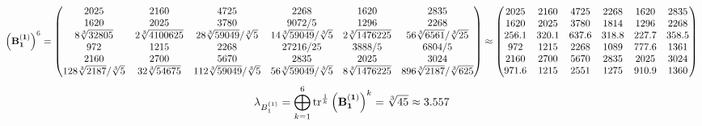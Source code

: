 \documentclass[10pt,a4paper]{article}
\begin{document}
	\[
		\left(\bold{B_1^{(1)}}\right)^{6} = 
		\begin{pmatrix}
			{{2025}}{} & {{2160}}{} & {{4725}}{} & {{2268}}{} & {{1620}}{} & {{2835}}{} \\
			{{1620}}{} & {{2025}}{} & {{3780}}{} & {{9072}} / {{5}} & {{1296}}{} & {{2268}}{} \\
			{{8}\sqrt[3]{32805}}{} & {{2}\sqrt[3]{4100625}}{} & {{28}\sqrt[3]{59049}} / {\sqrt[3]{5}} & {{14}\sqrt[3]{59049}} / {\sqrt[3]{5}} & {{2}\sqrt[3]{1476225}}{} & {{56}\sqrt[3]{6561}} / {\sqrt[3]{25}} \\
			{{972}}{} & {{1215}}{} & {{2268}}{} & {{27216}} / {{25}} & {{3888}} / {{5}} & {{6804}} / {{5}} \\
			{{2160}}{} & {{2700}}{} & {{5670}}{} & {{2835}}{} & {{2025}}{} & {{3024}}{} \\
			{{128}\sqrt[3]{2187}} / {\sqrt[3]{5}} & {{32}\sqrt[3]{54675}}{} & {{112}\sqrt[3]{59049}} / {\sqrt[3]{5}} & {{56}\sqrt[3]{59049}} / {\sqrt[3]{5}} & {{8}\sqrt[3]{1476225}}{} & {{896}\sqrt[3]{2187}} / {\sqrt[3]{625}} \\
		\end{pmatrix}
		\approx
		\begin{pmatrix}
			2025     & 2160     & 4725     & 2268     & 1620     & 2835     \\
			1620     & 2025     & 3780     & 1814     & 1296     & 2268     \\
			256.1    & 320.1    & 637.6    & 318.8    & 227.7    & 358.5    \\
			972      & 1215     & 2268     & 1089     & 777.6    & 1361     \\
			2160     & 2700     & 5670     & 2835     & 2025     & 3024     \\
			971.6    & 1215     & 2551     & 1275     & 910.9    & 1360     \\
		\end{pmatrix}
	\]
	\[
		\lambda_{B_1^{(1)}} =  \bigoplus ^{6} _{k = 1} \operatorname{tr} ^{\frac 1 k} \left( \bold{B_1^{(1)}} \right)^k = {\sqrt[3]{45}}{}\approx 3.557
	\]
\end{document}
